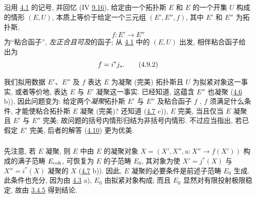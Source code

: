 \setcounter{subsection}{8}
\subsection{}
沿用 \hyperref[VI.subsec4.1]{4.1} 的记号,
并回忆 (IV \hyperref[IV.theo9.5.4]{9.16}),
给定由一个拓扑斯 $E$ 和 $E$ 的一个开集 $U$ 构成的情形 $(E,U)$,
本质上等价于给定一个三元组 $(E',E'',f)$,
其中 $E'$ 和 $E''$ 为\pageoriginale{}拓扑斯,
\begin{equation*}
f : E'\to E''\tag{4.9.1}
\end{equation*}
为“粘合函子”, \ie \emph{左正合且可及}的函子;
从 \hyperref[VI.subsec4.1]{4.1} 中的 $(E,U)$ 出发,
相伴粘合函子给出为
\begin{equation*}
  f = i^{\ast} j_{\ast}{}.\tag{4.9.2}
\end{equation*}

我们拟用数据 $E'$、$E''$ 及 $f$
表达 $E$ 为凝聚 (\resp 完美) 拓扑斯且 $U$ 为拟紧对象这一事实,
或者等价地, 表达 $E$ 与 $E'$ 凝聚这一事实.
已经知道, 这蕴含 $E''$ 也凝聚
(\hyperref[VI.prop4.6]{4.6} b)),
因此问题变为:
给定两个\emph{凝聚}拓扑斯 $E'$ 与 $E''$
及粘合函子 $f$ ,
$f$ 须满足什么条件, 才能使粘合拓扑斯 $E$ 凝聚 (\resp 完美)?
还知道 (\hyperref[VI.cor4.7]{4.7} c)),
$E$ 完美, 当且仅当 $E$ 凝聚且 $E'$ 与 $E''$ 完美;
故问题的括号内情形归结为非括号内情形.
不过应当指出, 若已假定 $E'$ 完美,
后者的解答 (\hyperref[VI.prop4.10]{4.10}) 更为优美.

\setcounter{subsection}{9}
\setcounter{subsubsection}{2}
\subsubsection{}

先注意, 若 $E$ 凝聚,
则 $E$ 中由 $E$ 的凝聚对象
$X=(X',X'',u:X''\to f(X'))$ 构成的满子范畴 $E_{\mathrm{coh}}$,
可恢复为 $E$ 的子范畴 $E_0$,
其对象为\pageoriginale{}使
$X'=j^{\ast}(X)$ 与 $X''=i^{\ast}(X)$ 凝聚的 $X$
(\hyperref[VI.cor4.7]{4.7} b)).
因此, $E$ 凝聚的必要条件是前述子范畴 $E_0$ 生成.
此条件也充分,
因为由 \hyperref[VI.cor4.3]{4.3} a),
$E_0$ 由拟紧对象构成;
而且 $E_0$ 显然对有限投射极限稳定,
故由 \hyperref[VI.subsubsec2.4.5]{3.4.5} 得到结论.

